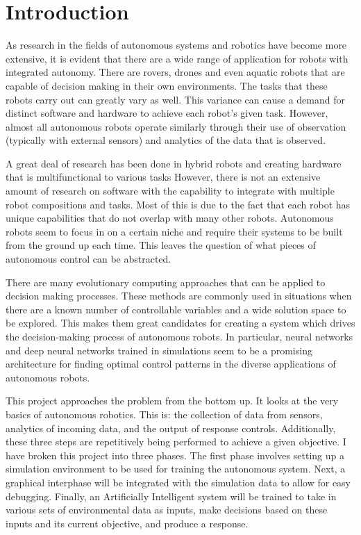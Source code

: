 

\chapter{Introduction}
As research in the fields of autonomous systems and robotics have become more extensive, it is evident that there are a wide range of application for robots with integrated autonomy.
There are rovers, drones and even aquatic robots that are capable of decision making in their own environments.
The tasks that these robots carry out can greatly vary as well.
This variance can cause a demand for distinct software and hardware to achieve each robot’s given task.
However, almost all autonomous robots operate similarly through their use of observation (typically with external sensors) and analytics of the data that is observed.

A great deal of research has been done in hybrid robots and creating hardware that is multifunctional to various tasks
However, there is not an extensive amount of research on software with the capability to integrate with multiple robot compositions and tasks.
Most of this is due to the fact that each robot has unique capabilities that do not overlap with many other robots.
Autonomous robots seem to focus in on a certain niche and require their systems to be built from the ground up each time.
This leaves the question of what pieces of autonomous control can be abstracted.

There are many evolutionary computing approaches that can be applied to decision making processes.
These methods are commonly used in situations when there are a known number of controllable variables and a wide solution space to be explored.
This makes them great candidates for creating a system which drives the decision-making process of autonomous robots.
In particular, neural networks and deep neural networks trained in simulations seem to be a promising architecture for finding optimal control patterns in the diverse applications of autonomous robots.

This project approaches the problem from the bottom up.
It looks at the very basics of autonomous robotics.
This is: the collection of data from sensors, analytics of incoming data, and the output of response controls.
Additionally, these three steps are repetitively being performed to achieve a given objective.
I have broken this project into three phases.
The first phase involves setting up a simulation environment to be used for training the autonomous system.
Next, a graphical interphase will be integrated with the simulation data to allow for easy debugging.
Finally, an Artificially Intelligent system will be trained to take in various sets of environmental data as inputs, make decisions based on these inputs and its current objective, and produce a response.

